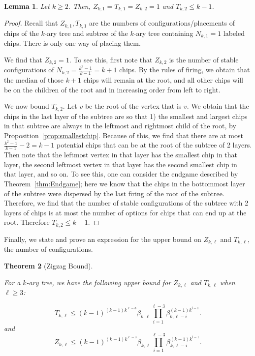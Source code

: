 \documentclass[11pt]{article}
\newtheorem{theorem}{Theorem}[section]
\newtheorem{lemma}[theorem]{Lemma}
\theoremstyle{remark}
\theoremstyle{definition}
\begin{document}
\begin{lemma}\label{lem:small} Let $k \geq 2$. Then, 
    $Z_{k, 1} = T_{k, 1} = Z_{k, 2} = 1$ and $ T_{k, 2} \leq k-1$.
\end{lemma}
\begin{proof}
   Recall that $Z_{k, 1}, T_{k, 1}$ are the numbers of configurations/placements of chips of the $k$-ary tree and subtree of the $k$-ary tree containing $N_{k, 1} = 1$ labeled chips. There is only one way of placing them.

    We find that $Z_{k, 2} = 1$. To see this, first note that $Z_{k, 2}$ is the number of stable configurations of $N_{k, 2} = \frac{k^2 - 1}{k-1} = k+1$ chips. By the rules of firing, we obtain that the median of those $k+1$ chips will remain at the root, and all other chips will be on the children of the root and in increasing order from left to right.
    
    We now bound $ T_{k, 2}$. Let $v$ be the root of the vertex that is $v$. We obtain that the chips in the last layer of the subtree are so that 1) the smallest and largest chips in that subtree are always in the leftmost and rightmost child of the root, by Proposition~\ref{prop:smallestchip}. Because of this, we find that there are at most $\frac{k^2-1}{k-1}-2 = k-1$ potential chips that can be at the root of the subtree of 2 layers. Then note that the leftmost vertex in that layer has the smallest chip in that layer, the second leftmost vertex in that layer has the second smallest chip in that layer, and so on. To see this, one can consider the endgame described by Theorem~\ref{thm:Endgame}; here we know that the chips in the bottommost layer of the subtree were dispersed by the last firing of the root of the subtree. Therefore, we find that the number of stable configurations of the subtree with 2 layers of chips is at most the number of options for chips that can end up at the root. Therefore $T_{k, 2} \leq k-1$.
\end{proof}

Finally, we state and prove an expression for the upper bound on $Z_{k, \ell}$ and $T_{k, \ell}$, the number of configurations.

\begin{theorem}[Zigzag Bound]\label{thm:GeneralZigzagBound}

For a $k$-ary tree, we have the following upper bound for $Z_{k,\ell}$ and $T_{k,\ell}$ when $\ell \ge 3$: 

$$T_{k, \ell}\le (k-1)^{(k-1)k^{\ell-3}} \beta_{k, \ell} \prod_{i=1}^{\ell-3} \beta_{k, \ell-i}^{(k-1)k^{i-1}}.$$ and  $$Z_{k, \ell}\le (k-1)^{(k-1)k^{\ell-3}} \beta_{k, \ell} \prod_{i=1}^{\ell-3} \beta_{k, \ell-i}^{(k-1)k^{i-1}}.$$

\end{theorem}
\end{document}
